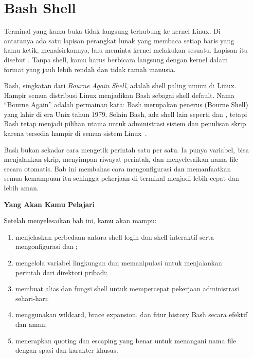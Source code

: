 
\chapter{Bash Shell}
\label{ch:bash-shell-basic}


Terminal yang kamu buka tidak langsung terhubung ke kernel Linux. Di antaranya ada
satu lapisan perangkat lunak yang membaca setiap baris yang kamu ketik, menafsirkannya,
lalu meminta kernel melakukan sesuatu. Lapisan itu disebut . Tanpa shell,
kamu harus berbicara langsung dengan kernel dalam format yang jauh lebih rendah dan
tidak ramah manusia.

Bash, singkatan dari \textit{Bourne Again Shell}, adalah shell paling
umum di Linux. Hampir semua distribusi Linux menjadikan Bash sebagai
shell default. Nama ``Bourne Again'' adalah permainan kata: Bash
merupakan penerus  (Bourne Shell) yang lahir di era Unix tahun
1979. Selain Bash, ada shell lain seperti  dan ,
tetapi Bash tetap menjadi pilihan utama untuk administrasi sistem dan
penulisan skrip karena tersedia hampir di semua sistem Linux~\cite{bash2024}.

Bash bukan sekadar cara mengetik perintah satu per satu. Ia punya variabel, bisa
menjalankan skrip, menyimpan riwayat perintah, dan menyelesaikan nama file secara
otomatis. Bab ini membahas cara mengonfigurasi dan memanfaatkan semua kemampuan itu
sehingga pekerjaan di terminal menjadi lebih cepat dan lebih aman.

\textbf{Yang Akan Kamu Pelajari}

Setelah menyelesaikan bab ini, kamu akan mampu:

\begin{enumerate}
    \item menjelaskan perbedaan antara shell login dan shell interaktif serta
          mengonfigurasi  dan ;
    \item mengelola variabel lingkungan dan memanipulasi  untuk
          menjalankan perintah dari direktori pribadi;
    \item membuat alias dan fungsi shell untuk mempercepat pekerjaan
          administrasi sehari-hari;
    \item menggunakan wildcard, brace expansion, dan fitur history Bash
          secara efektif dan aman;
    \item menerapkan quoting dan escaping yang benar untuk menangani
          nama file dengan spasi dan karakter khusus.
\end{enumerate}

